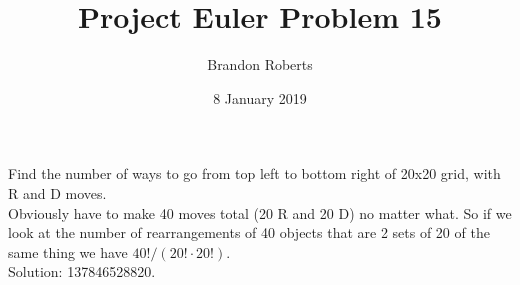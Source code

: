 \documentclass{article}
\begin{document}
\title{Project Euler Problem 15}
\author{Brandon Roberts}
\date{8 January 2019}

\maketitle

Find the number of ways to go from top left to bottom right of 20x20 grid, with R and D moves.\\
Obviously have to make 40 moves total (20 R and 20 D) no matter what. So if we look at the number of rearrangements of 40 objects that are 2 sets of 20 of the same thing we have $40!/(20!\cdot 20!)$.\\
Solution: 137846528820.
\end{document}

